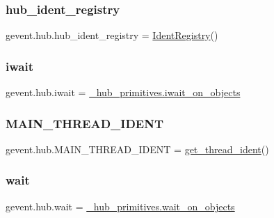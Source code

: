 \subsubsection{\texorpdfstring{hub\+\_\+ident\+\_\+registry}{hub\_ident\_registry}}
{\footnotesize\ttfamily gevent.\+hub.\+hub\+\_\+ident\+\_\+registry = \hyperlink{classgevent_1_1__ident_1_1_ident_registry}{Ident\+Registry}()}

\mbox{\label{namespacegevent_1_1hub_ac0495f7b4e74e001a73e04cb1f92978a}} 
\subsubsection{\texorpdfstring{iwait}{iwait}}
{\footnotesize\ttfamily gevent.\+hub.\+iwait = \hyperlink{namespacegevent_1_1__hub__primitives_ae5fd0efa38447d7a7a15f9218ae50c19}{\+\_\+hub\+\_\+primitives.\+iwait\+\_\+on\+\_\+objects}}

\mbox{\label{namespacegevent_1_1hub_aed3ef3b0ddba2d582cc0b88e3ea2d48f}} 
\subsubsection{\texorpdfstring{M\+A\+I\+N\+\_\+\+T\+H\+R\+E\+A\+D\+\_\+\+I\+D\+E\+NT}{MAIN\_THREAD\_IDENT}}
{\footnotesize\ttfamily gevent.\+hub.\+M\+A\+I\+N\+\_\+\+T\+H\+R\+E\+A\+D\+\_\+\+I\+D\+E\+NT = \hyperlink{namespacegevent_1_1hub_a25afe960c9af2c46325de894129e1ed2}{get\+\_\+thread\+\_\+ident}()}

\mbox{\label{namespacegevent_1_1hub_a5ed661434216439b7d4f2ca4c79fd94f}} 
\subsubsection{\texorpdfstring{wait}{wait}}
{\footnotesize\ttfamily gevent.\+hub.\+wait = \hyperlink{namespacegevent_1_1__hub__primitives_a670618f9da100eaaa5d2a7b80b746926}{\+\_\+hub\+\_\+primitives.\+wait\+\_\+on\+\_\+objects}}

